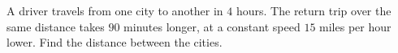 A driver travels from one city to another in $4$ hours. The return trip over the same distance takes $90$ minutes longer, at a constant speed $15$ miles per hour lower. Find the distance between the cities.
